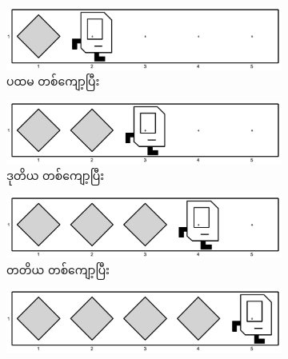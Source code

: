 
\begin{figure}[thb!]
    \newcommand{\figpctw}{0.49}
    \begin{subfigure}[t]{{\figpctw}\textwidth}
        \includegraphics[scale=0.15]{images/ch04/mrofb/1st_iter.jpg}
        \caption{ပထမ တစ်ကျော့ပြီး}  
        \label{fig:mrofb_recur2}   
    \end{subfigure}
    \begin{subfigure}[t]{{\figpctw}\textwidth}
        \includegraphics[scale=0.15]{images/ch04/mrofb/2nd_iter.jpg}
        \caption{ဒုတိယ တစ်ကျော့ပြီး}  
        \label{fig:mrofb_recur3}  
    \end{subfigure}
    \begin{subfigure}[t]{{\figpctw}\textwidth}
        \includegraphics[scale=0.15]{images/ch04/mrofb/3rd_iter.jpg}
        \caption{တတိယ တစ်ကျော့ပြီး}  
        \label{fig:mrofb_recur4}  
    \end{subfigure}
    \begin{subfigure}[t]{{\figpctw}\textwidth}
        \includegraphics[scale=0.15]{images/ch04/mrofb/4th_iter.jpg}

\end{subfigure}
\end{figure}
